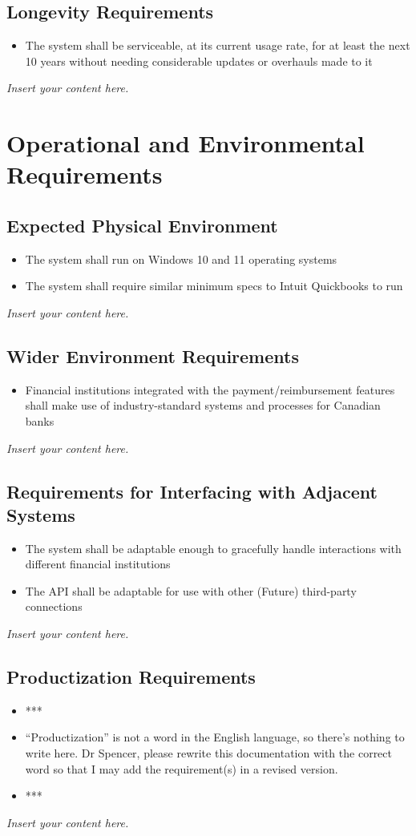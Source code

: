\documentclass[12pt]{article}
\newcommand{\lips}{\textit{Insert your content here.}}
\begin{document}
\subsection{Longevity Requirements}
\begin{itemize}
    \item The system shall be serviceable, at its current usage rate, for at least the next 10 years without needing considerable updates or overhauls made to it
\end{itemize}
\lips

\section{Operational and Environmental Requirements}
\subsection{Expected Physical Environment}
\begin{itemize}
    \item The system shall run on Windows 10 and 11 operating systems 
    \item The system shall require similar minimum specs to Intuit Quickbooks to run
\end{itemize}
\lips
\subsection{Wider Environment Requirements}
\begin{itemize}
    \item Financial institutions integrated with the payment/reimbursement features shall make use of industry-standard systems and processes for Canadian banks
\end{itemize}
\lips
\subsection{Requirements for Interfacing with Adjacent Systems}
\begin{itemize}
    \item The system shall be adaptable enough to gracefully handle interactions with different financial institutions
    \item The API shall be adaptable for use with other (Future) third-party connections
\end{itemize}
\lips
\subsection{Productization Requirements}
\begin{itemize}
    \item ***
    \item “Productization” is not a word in the English language, so there’s nothing to write here. Dr Spencer, please rewrite this documentation with the correct word so that I may add the requirement(s) in a revised version.
    \item ***
\end{itemize}
\lips
\end{document}

